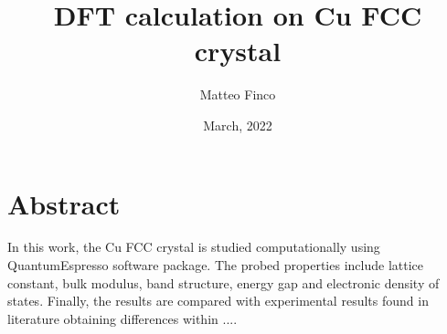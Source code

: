 \documentclass[
	12pt, %
]{fphw}
\title{DFT calculation on Cu FCC crystal} %
\author{Matteo Finco} %
\date{March, 2022} %
\institute{Università degli studi di Padova, Dipartimento di Scienze Chimiche} %
\begin{document}
 
\maketitle %


\section*{Abstract}
In this work, the Cu FCC crystal is studied computationally using QuantumEspresso software package. The probed properties include lattice constant, bulk modulus, band structure, energy gap and electronic density of states. Finally, the results are compared with experimental results found in literature obtaining differences within .... 



\end{document}
